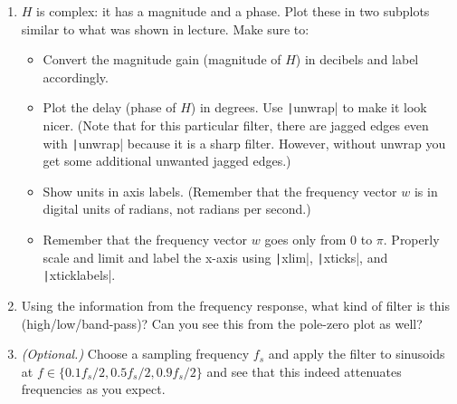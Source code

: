 \documentclass{article}
\begin{document}
\begin{enumerate}
\begin{enumerate}
  \item $H$ is complex: it has a magnitude and a phase. Plot these in two subplots similar to what was shown in lecture. Make sure to:
    \begin{itemize}
    \item Convert the magnitude gain (magnitude of $H$) in decibels and label accordingly.
    \item Plot the delay (phase of $H$) in degrees. Use \texttt|unwrap| to make it look nicer. (Note that for this particular filter, there are jagged edges even with \texttt|unwrap| because it is a sharp filter. However, without unwrap you get some additional unwanted jagged edges.)
    \item Show units in axis labels. (Remember that the frequency vector $w$ is in digital units of radians, not radians per second.)
    \item Remember that the frequency vector $w$ goes only from $0$ to $\pi$. Properly scale and limit and label the x-axis using \texttt|xlim|, \texttt|xticks|, and \texttt|xticklabels|.
    \end{itemize}

  \item Using the information from the frequency response, what kind of filter is this (high/low/band-pass)? Can you see this from the pole-zero plot as well?

  \item \textit{(Optional.)} Choose a sampling frequency $f_s$ and apply the filter to sinusoids at $f\in\{0.1f_s/2,0.5f_s/2,0.9f_s/2\}$ and see that this indeed attenuates frequencies as you expect.
  \end{enumerate}
\end{enumerate}
\end{document}
